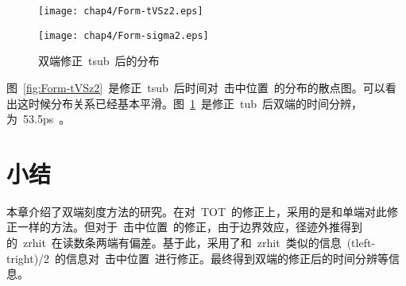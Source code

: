 \begin{figure}[!h]
\begin{minipage}[!h]{0.5\linewidth}
\texttt{[image: chap4/Form-tVSz2.eps]}
\label{fig:Form-tVSz2}
\end{minipage}%
\hfill
\begin{minipage}[!h]{0.5\linewidth}
\texttt{[image: chap4/Form-sigma2.eps]}
\label{fig:Form-sigma2}
\end{minipage}
\caption{双端修正~tsub~后的分布}
\end{figure}

图~\ref{fig:Form-tVSz2}~是修正~tsub~后时间对~击中位置~的分布的散点图。可以看出这时候分布关系已经基本平滑。图~\ref{fig:Form-sigma2}~是修正~tub~后双端的时间分辨，为~53.5ps~。

\section{小结}

本章介绍了双端刻度方法的研究。在对~TOT~的修正上，采用的是和单端对此修正一样的方法。但对于~击中位置~的修正，由于边界效应，径迹外推得到的~zrhit~在读数条两端有偏差。基于此，采用了和~zrhit~类似的信息~(tleft-tright)/2~的信息对~击中位置~进行修正。最终得到双端的修正后的时间分辨等信息。











